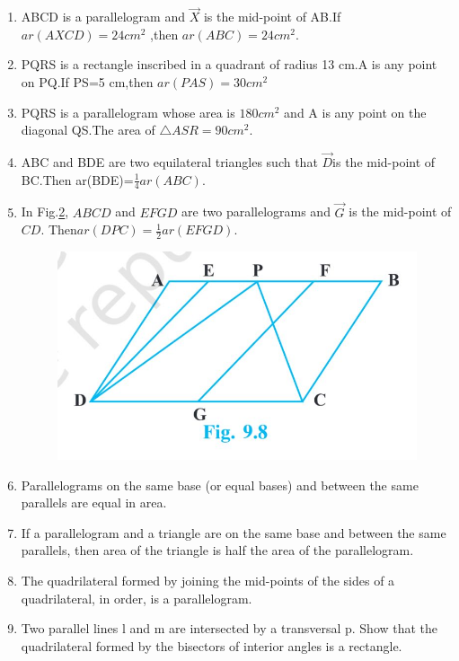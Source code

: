 \begin{enumerate}[label=\arabic*.,ref=\thesubsection.\theenumi]
\begin{figure}[h]
	\caption{}
	\label{fig:exemplar/9.9.4/9.27}
\end{figure}
	\item ABCD is a parallelogram and $\vec{X}$ is the mid-point of AB.If $ ar(AXCD)= 24 cm^2 $ ,then $ar(ABC) =  24cm^2 $.
\item PQRS is a rectangle inscribed in a quadrant of radius 13 cm.A is any point on PQ.If PS=5 cm,then $ar(PAS)= 30 cm^2 $
\item PQRS is a parallelogram whose area is $ 180 cm^2 $ and A is any point on the diagonal QS.The area of $\triangle ASR =90 cm^2$.
\item ABC and BDE are two equilateral triangles such that $\vec{D}$is the mid-point of BC.Then ar(BDE)=$\frac{1}{4}  ar(ABC)$.
\item In Fig.\ref{fig:exemplar/9.8/9.8}, $ABCD$ and $EFGD$ are two parallelograms and $\vec{G}$ is the mid-point of $CD$. Then$ ar(DPC)=\frac{1}{2}  ar(EFGD)$.
	\begin{figure}[h]
		\centering
		\includegraphics[width=\columnwidth]{exemplar/9.9.2/figs/9.8.jpg}
		\caption{}
		\label{fig:exemplar/9.8/9.8}
	\end{figure}
%
%
%
%
\item Parallelograms on the same base (or equal bases) and between the same parallels are equal in area.
\item If a parallelogram and a triangle are on the same base and between the same parallels, then area of the triangle is half the area of the parallelogram.
%
\item  The quadrilateral formed by joining the mid-points of the sides of a quadrilateral, in order, is a parallelogram.
%
%
\item Two parallel lines l and m are intersected by a transversal p. Show that the quadrilateral formed by the bisectors of interior angles is a rectangle.

\end{enumerate}
